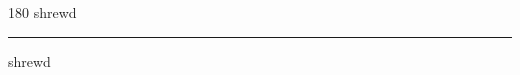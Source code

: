 
\begin{frame}
\begin{center}
\begin{turn}{180}
{\fontsize{2.5cm}{1em}\selectfont shrewd}
\end{turn}
\vspace{1em}\par  
\hrule
\vspace{1em}\par  
{\fontsize{2.5cm}{1em}\selectfont shrewd}
\end{center}
\end{frame}
